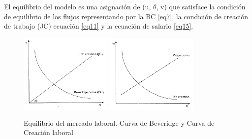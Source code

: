 \documentclass[12pt,oneside]{reedthesis}
\begin{document}
El equilibrio del modelo es una asignación de (u, \(\theta\), v) que satisface la condición de equilibrio de los flujos representando por la BC \eqref{eq7}, la condición de creación de trabajo (JC) ecuación \eqref{eq11} y la ecuación de salario \eqref{eq15}.
\begin{figure}[h!]
    \centering
    {%
        \includegraphics[width=0.4\textwidth]{JC_BC_(v,u).png}%
        \label{fig:a}%
    }%
    \hfill%
    {%
        \includegraphics[width=0.4\textwidth]{WC_JC_(w,theta).png}%
        \label{fig:b}%
    }%
    \caption{Equilibrio del mercado laboral. Curva de Beveridge y Curva de Creación laboral}
\end{figure}
\newpage
\end{document}
